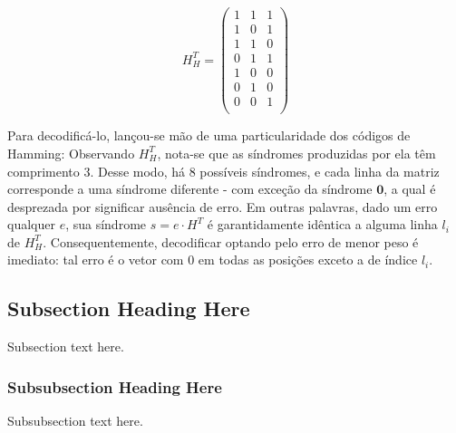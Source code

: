 \documentclass[journal,comsoc]{IEEEtran}
\begin{document}
    \begin{equation}
        H_H^T=\left(
        \begin{array}{ccc}
        1 & 1 & 1 \\
        1 & 0 & 1 \\
        1 & 1 & 0 \\
        0 & 1 & 1 \\
        1 & 0 & 0 \\
        0 & 1 & 0 \\
        0 & 0 & 1 \\
        \end{array}
        \right)
    \end{equation}

    Para decodificá-lo, lançou-se mão de uma particularidade dos 
    códigos de Hamming: Observando $H_H^T$, nota-se que as síndromes
    produzidas por ela têm comprimento 3. Desse modo, há 8 possíveis
    síndromes, e cada linha da matriz corresponde a uma síndrome 
    diferente - com exceção da síndrome $\bm{0}$, a qual é desprezada
    por significar ausência de erro. Em outras
    palavras, dado um erro qualquer $e$, sua síndrome 
    $s=e \cdot H^T$ é garantidamente idêntica a alguma linha $l_i$ de 
    $H_H^T$. Consequentemente, decodificar optando pelo erro de menor peso
    é imediato: tal erro é o vetor com 0 em todas as posições exceto a de índice
    $l_i$.

    \subsection{Subsection Heading Here}
    Subsection text here.
    
    
    \subsubsection{Subsubsection Heading Here}
    Subsubsection text here.
    
    
    
\end{document}
